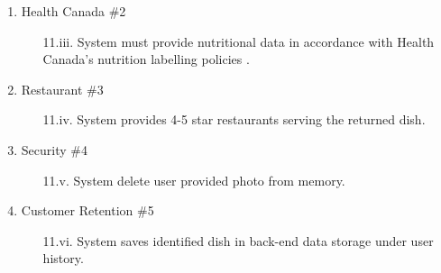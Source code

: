 \documentclass[]{article}
\begin{document}
\begin{enumerate}[{\bf BE1.}]
\begin{enumerate}[{\bf VP1.}]
			\item Health Canada  \#2
				\begin{enumerate}
					\item[11.iii.] System must provide nutritional data in accordance with Health Canada's nutrition labelling policies \cite{CanadaNutrition}.
				\end{enumerate}
			\item Restaurant \#3
				\begin{enumerate}
					\item[11.iv.] System provides 4-5 star restaurants serving the returned dish.
				\end{enumerate}
			\item Security \#4 
				\begin{enumerate}
					\item[11.v.] System delete user provided photo from memory.
				\end{enumerate}
			\item Customer Retention \#5
				\begin{enumerate}
					\item[11.vi.] System saves identified dish in back-end data storage under user history.
				\end{enumerate}
		\end{enumerate}


\end{enumerate}
\end{document}

